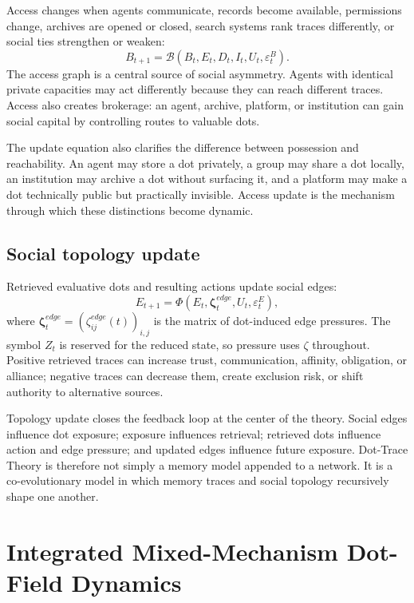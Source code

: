 \documentclass[11pt]{article}
\theoremstyle{remark}
\begin{document}
Access changes when agents communicate, records become available, permissions change, archives are opened or closed, search systems rank traces differently, or social ties strengthen or weaken:
\[
B_{t+1}=\mathcal B(B_t,E_t,D_t,I_t,U_t,\varepsilon_t^B).
\]
The access graph is a central source of social asymmetry. Agents with identical private capacities may act differently because they can reach different traces. Access also creates brokerage: an agent, archive, platform, or institution can gain social capital by controlling routes to valuable dots.

The update equation also clarifies the difference between possession and reachability. An agent may store a dot privately, a group may share a dot locally, an institution may archive a dot without surfacing it, and a platform may make a dot technically public but practically invisible. Access update is the mechanism through which these distinctions become dynamic.

\subsection{Social topology update}\label{social-topology-update}

Retrieved evaluative dots and resulting actions update social edges:
\[
E_{t+1}=\Phi(E_t,\boldsymbol{\zeta}_t^{edge},U_t,\varepsilon_t^E),
\]
where $\boldsymbol{\zeta}_t^{edge}=(\zeta_{ij}^{edge}(t))_{i,j}$ is the matrix of dot-induced edge pressures. The symbol $Z_t$ is reserved for the reduced state, so pressure uses $\zeta$ throughout. Positive retrieved traces can increase trust, communication, affinity, obligation, or alliance; negative traces can decrease them, create exclusion risk, or shift authority to alternative sources.

Topology update closes the feedback loop at the center of the theory. Social edges influence dot exposure; exposure influences retrieval; retrieved dots influence action and edge pressure; and updated edges influence future exposure. Dot-Trace Theory is therefore not simply a memory model appended to a network. It is a co-evolutionary model in which memory traces and social topology recursively shape one another.

\section{Integrated Mixed-Mechanism Dot-Field Dynamics}\label{integrated-mixed-mechanism-dynamics}
\end{document}
